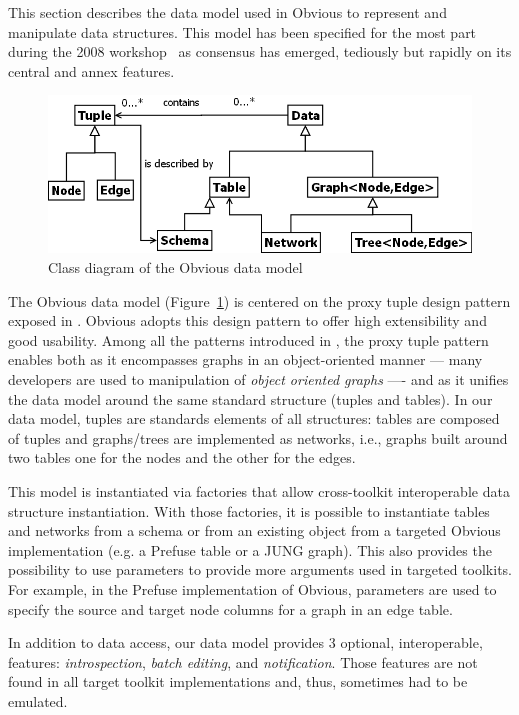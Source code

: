 This section describes the data model used in Obvious to represent and
manipulate data structures.  This model has been specified for the
most part during the 2008 workshop~\cite{vismaster2008} as consensus
has emerged, tediously but rapidly on its central and annex features.

\begin{figure}[!ht]
\centering
\includegraphics[width=0.7\columnwidth]{figures/obviousdataclass}
\caption{Class diagram of the Obvious data model}
\label{fig:datamodel}
\end{figure}

The Obvious data model (Figure~\ref{fig:datamodel}) is centered on the
proxy tuple design pattern exposed in \cite{DesignPatternsIV}. Obvious
adopts this design pattern to offer high extensibility and good
usability.  Among all the patterns introduced
in \cite{DesignPatternsIV}, the proxy tuple pattern enables both as it
encompasses graphs in an object-oriented manner --- many developers
are used to manipulation of \emph{object oriented graphs} ---- and as
it unifies the data model around the same standard structure (tuples
and tables). In our data model, tuples are standards elements of all
structures: tables are composed of tuples and graphs/trees are
implemented as networks, i.e., graphs built around two tables one for
the nodes and the other for the edges.

This model is instantiated via factories that allow cross-toolkit
interoperable data structure instantiation. With those factories, it
is possible to instantiate tables and networks from a schema or from
an existing object from a targeted Obvious implementation (e.g. a
Prefuse table or a JUNG graph). This also provides the possibility
to use parameters to provide more arguments used in targeted
toolkits. For example, in the Prefuse implementation of Obvious,
parameters are used to specify the source and target node columns for
a graph in an edge table.

In addition to data access, our data model provides 3 optional,
interoperable, features: \emph{introspection}, \emph{batch editing},
and \emph{notification}. Those features are not found in all target
toolkit implementations and, thus, sometimes had to be emulated.
 
